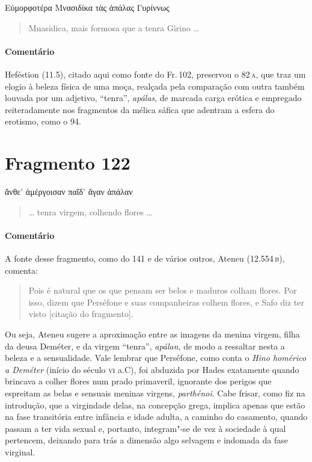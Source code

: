 \begin{gkverse}
Εὐμορφοτέρα Μνασιδίκα τὰς ἀπάλας Γυρίννως
\end{gkverse}

\begin{verse}
Mnasidica, mais formosa que a tenra Girino \ldots{}
\end{verse}

\medskip

{\paragraph{Comentário} Heféstion (11.5), citado aqui como fonte do Fr.\,102, preservou o 82\,\textsc{a}, que traz
um elogio à beleza física de uma moça, realçada pela comparação com outra
também louvada por um adjetivo, ``tenra'', \textit{apálas}, de marcada
carga erótica e empregado reiteradamente nos fragmentos da mélica sáfica que
adentram a esfera do erotismo, como o 94.}

\section{Fragmento 122}

\begin{gkverse}
ἄνθε’ ἀμέργοισαν παῖδ’ ἄγαν ἀπάλαν
\end{gkverse}

\begin{verse}
\ldots{} tenra virgem, colhendo flores \ldots{}
\end{verse}

\medskip

{\paragraph{Comentário} A fonte desse fragmento, como do 141 e de vários outros, Ateneu (12.554\,\textsc{b}), comenta: 

\begin{quote}
Pois é natural
que os que pensam ser belos e maduros colham flores. Por isso, dizem que
Perséfone e suas companheiras colhem flores, e Safo diz ter visto 
[citação do fragmento].
\end{quote}

 Ou seja, Ateneu sugere a aproximação entre as imagens
da menina virgem, filha da deusa Deméter, e da virgem ``tenra'', \textit{apálan}, de modo a ressaltar nesta a beleza e a
sensualidade. Vale lembrar que Perséfone, como conta o \textit{Hino homérico a Deméter} 
(início do século \textsc{vi} a.C), foi abduzida por Hades exatamente
quando brincava a colher flores num prado primaveril, ignorante dos perigos que
espreitam as belas e sensuais meninas virgens, \textit{parthénoi}. Cabe frisar, como fiz na introdução, que a virgindade delas,
na concepção grega, implica
apenas que estão na fase transitória entre infância e idade
adulta, a caminho do casamento, quando passam a ter vida sexual e, portanto, integram"-se
de vez à sociedade à qual pertencem, deixando para trás a dimensão algo
selvagem e indomada da fase virginal.}



